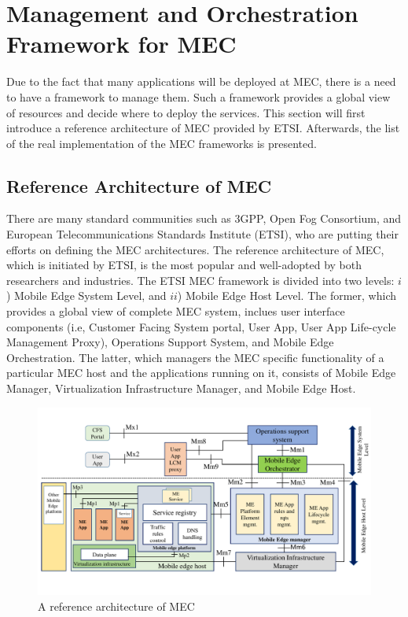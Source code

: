 \section{Management and Orchestration Framework for MEC} \label{framework}


Due to the fact that many applications will be deployed at MEC, there is a need to have a framework to manage them. Such a framework provides a global view of resources and decide where to deploy the services. This section will first introduce a reference architecture of MEC provided by ETSI. Afterwards, the list of the real implementation of the MEC frameworks is presented.

\subsection{Reference Architecture of MEC}

There are many standard communities such as 3GPP, Open Fog Consortium, and European Telecommunications Standards Institute (ETSI), who are putting their efforts on defining the MEC architectures. 
The reference architecture of MEC, which is initiated by ETSI, is the most popular and well-adopted by both researchers and industries. The ETSI MEC framework is divided into two levels: $i$) Mobile Edge System Level, and $ii$) Mobile Edge Host Level. The former, which provides a global view of complete MEC system, inclues user interface components (i.e, Customer Facing System portal, User App, User App Life-cycle Management Proxy), Operations Support System, and Mobile Edge Orchestration. The latter, which managers the MEC specific functionality of a particular MEC host and the applications running on it, consists of Mobile Edge Manager, Virtualization Infrastructure Manager, and Mobile Edge Host.


\begin{figure}[H]
  \begin{center}
   \includegraphics[width=14cm]{./figures/book-etsi-mec.pdf}
   \caption{A reference architecture of MEC}
   \label{fig:etsi-mec}
   \end{center}
\end{figure}



